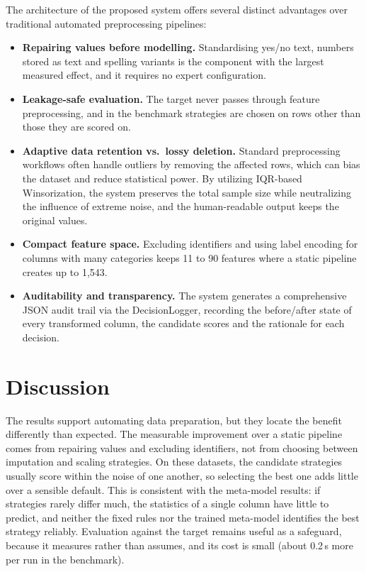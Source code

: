 \documentclass[11pt,a4paper]{article}
\begin{document}
The architecture of the proposed system offers several distinct advantages over traditional automated preprocessing pipelines:
\begin{itemize}
    \item \textbf{Repairing values before modelling.} Standardising yes/no text, numbers stored as text and spelling variants is the component with the largest measured effect, and it requires no expert configuration.
    \item \textbf{Leakage-safe evaluation.} The target never passes through feature preprocessing, and in the benchmark strategies are chosen on rows other than those they are scored on.
    \item \textbf{Adaptive data retention vs.\ lossy deletion.} Standard preprocessing workflows often handle outliers by removing the affected rows, which can bias the dataset and reduce statistical power. By utilizing IQR-based Winsorization, the system preserves the total sample size while neutralizing the influence of extreme noise, and the human-readable output keeps the original values.
    \item \textbf{Compact feature space.} Excluding identifiers and using label encoding for columns with many categories keeps 11 to 90 features where a static pipeline creates up to 1,543.
    \item \textbf{Auditability and transparency.} The system generates a comprehensive JSON audit trail via the DecisionLogger, recording the before/after state of every transformed column, the candidate scores and the rationale for each decision.
\end{itemize}


\section{Discussion}

The results support automating data preparation, but they locate the benefit differently than expected. The measurable improvement over a static pipeline comes from repairing values and excluding identifiers, not from choosing between imputation and scaling strategies. On these datasets, the candidate strategies usually score within the noise of one another, so selecting the best one adds little over a sensible default. This is consistent with the meta-model results: if strategies rarely differ much, the statistics of a single column have little to predict, and neither the fixed rules nor the trained meta-model identifies the best strategy reliably. Evaluation against the target remains useful as a safeguard, because it measures rather than assumes, and its cost is small (about 0.2\,s more per run in the benchmark).
\end{document}
